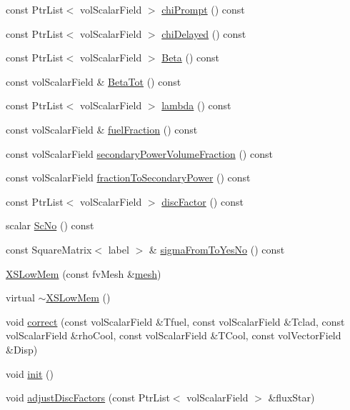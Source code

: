 \begin{DoxyCompactItemize}
const Ptr\+List$<$ vol\+Scalar\+Field $>$ \hyperlink{classFoam_1_1XSLowMem_a3a5e5dc25bec8fab86781d7eb546a92f}{chi\+Prompt} () const
\item 
const Ptr\+List$<$ vol\+Scalar\+Field $>$ \hyperlink{classFoam_1_1XSLowMem_a8453995c1f390f686ffb8d0f3fd639c6}{chi\+Delayed} () const
\item 
const Ptr\+List$<$ vol\+Scalar\+Field $>$ \hyperlink{classFoam_1_1XSLowMem_a18490f453da25d7d0de6e64d27566fe5}{Beta} () const
\item 
const vol\+Scalar\+Field \& \hyperlink{classFoam_1_1XSLowMem_a8da9750eb290754d0fdf9fdadcb33912}{Beta\+Tot} () const
\item 
const Ptr\+List$<$ vol\+Scalar\+Field $>$ \hyperlink{classFoam_1_1XSLowMem_a9fe5da186e1af8ac5b1a3adff2686609}{lambda} () const
\item 
const vol\+Scalar\+Field \& \hyperlink{classFoam_1_1XSLowMem_afcbaacd46910f24a213517f080e5cc6a}{fuel\+Fraction} () const
\item 
const vol\+Scalar\+Field \hyperlink{classFoam_1_1XSLowMem_a52899ae5805771cf443d9a7e6ba81dc5}{secondary\+Power\+Volume\+Fraction} () const
\item 
const vol\+Scalar\+Field \hyperlink{classFoam_1_1XSLowMem_aa8387c8a487d8285a32ef61af121e35e}{fraction\+To\+Secondary\+Power} () const
\item 
const Ptr\+List$<$ vol\+Scalar\+Field $>$ \hyperlink{classFoam_1_1XSLowMem_a37492f221b3e42a24a81a6defba591fc}{disc\+Factor} () const
\item 
scalar \hyperlink{classFoam_1_1XSLowMem_a35ef675ab2b1fab8ba01a2fc817df427}{Sc\+No} () const
\item 
const Square\+Matrix$<$ label $>$ \& \hyperlink{classFoam_1_1XSLowMem_a7c67acb09982bbe0c4666be96ee8fd90}{sigma\+From\+To\+Yes\+No} () const
\item 
\hyperlink{classFoam_1_1XSLowMem_a4b6969c39c49dc09d5252c1b06ea6623}{X\+S\+Low\+Mem} (const fv\+Mesh \&\hyperlink{createMeshesPostProcess_8H_a8bb1e58291d2d2b653e024a4f4bffe38}{mesh})
\item 
virtual \hyperlink{classFoam_1_1XSLowMem_a472abf82f93e4ed7ef94b19d8f0e1d5f}{$\sim$\+X\+S\+Low\+Mem} ()
\item 
void \hyperlink{classFoam_1_1XSLowMem_adea4123ce2829dffe4bcf6104a52e8a7}{correct} (const vol\+Scalar\+Field \&Tfuel, const vol\+Scalar\+Field \&Tclad, const vol\+Scalar\+Field \&rho\+Cool, const vol\+Scalar\+Field \&T\+Cool, const vol\+Vector\+Field \&Disp)
\item 
void \hyperlink{classFoam_1_1XSLowMem_a02fd73d861ef2e4aabb38c0c9ff82947}{init} ()
\item 
void \hyperlink{classFoam_1_1XSLowMem_af611217ca3fa489260d3f17c7b29f71d}{adjust\+Disc\+Factors} (const Ptr\+List$<$ vol\+Scalar\+Field $>$ \&flux\+Star)
\end{DoxyCompactItemize}
